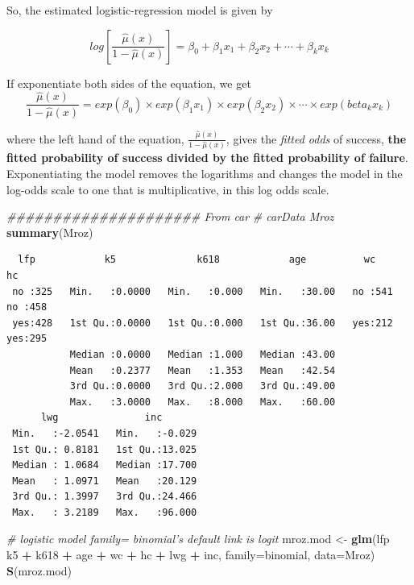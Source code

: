 \documentclass[
]{article}
\newenvironment{Shaded}{\begin{snugshade}}{\end{snugshade}}
\newcommand{\CommentTok}[1]{\textcolor[rgb]{0.56,0.35,0.01}{\textit{#1}}}
\newcommand{\DataTypeTok}[1]{\textcolor[rgb]{0.13,0.29,0.53}{#1}}
\newcommand{\KeywordTok}[1]{\textcolor[rgb]{0.13,0.29,0.53}{\textbf{#1}}}
\newcommand{\NormalTok}[1]{#1}
\newcommand{\OperatorTok}[1]{\textcolor[rgb]{0.81,0.36,0.00}{\textbf{#1}}}
\newcommand{\StringTok}[1]{\textcolor[rgb]{0.31,0.60,0.02}{#1}}
\begin{document}
So, the estimated logistic-regression model is given by

\[log[\frac{\hat\mu(x)}{1-\hat\mu(x)}] = \beta_0 + \beta_1 x_1 + \beta_2 x_2 + \cdots + \beta_k x_k\]

If exponentiate both sides of the equation, we get
\[\frac{\hat\mu(x)}{1-\hat\mu(x)} = exp(\beta_0) \times exp(\beta_1 x_1) \times exp(\beta_2 x_2) \times \cdots \times exp(beta_k x_k)\]

where the left hand of the equation,
\(\frac{\hat\mu(x)}{1-\hat\mu(x)}\), gives the \emph{fitted odds} of
success, \textbf{the fitted probability of success divided by the fitted
probability of failure}. Exponentiating the model removes the logarithms
and changes the model in the log-odds scale to one that is
multiplicative, in this log odds scale.

\begin{Shaded}
\begin{Highlighting}[]
\CommentTok{##################### From car}
\CommentTok{# carData Mroz}
\KeywordTok{summary}\NormalTok{(Mroz)}
\end{Highlighting}
\end{Shaded}

\begin{verbatim}
  lfp            k5              k618            age          wc        hc     
 no :325   Min.   :0.0000   Min.   :0.000   Min.   :30.00   no :541   no :458  
 yes:428   1st Qu.:0.0000   1st Qu.:0.000   1st Qu.:36.00   yes:212   yes:295  
           Median :0.0000   Median :1.000   Median :43.00                      
           Mean   :0.2377   Mean   :1.353   Mean   :42.54                      
           3rd Qu.:0.0000   3rd Qu.:2.000   3rd Qu.:49.00                      
           Max.   :3.0000   Max.   :8.000   Max.   :60.00                      
      lwg               inc        
 Min.   :-2.0541   Min.   :-0.029  
 1st Qu.: 0.8181   1st Qu.:13.025  
 Median : 1.0684   Median :17.700  
 Mean   : 1.0971   Mean   :20.129  
 3rd Qu.: 1.3997   3rd Qu.:24.466  
 Max.   : 3.2189   Max.   :96.000  
\end{verbatim}

\begin{Shaded}
\begin{Highlighting}[]
\CommentTok{# logistic model family= binomial's default link is logit}
\NormalTok{mroz.mod <-}\StringTok{ }\KeywordTok{glm}\NormalTok{(lfp }\OperatorTok{~}\StringTok{ }\NormalTok{k5 }\OperatorTok{+}\StringTok{ }\NormalTok{k618 }\OperatorTok{+}\StringTok{ }\NormalTok{age }\OperatorTok{+}\StringTok{ }\NormalTok{wc }\OperatorTok{+}\StringTok{ }\NormalTok{hc }\OperatorTok{+}\StringTok{ }\NormalTok{lwg }\OperatorTok{+}\StringTok{ }\NormalTok{inc, }\DataTypeTok{family=}\NormalTok{binomial, }\DataTypeTok{data=}\NormalTok{Mroz)}
\KeywordTok{S}\NormalTok{(mroz.mod)}
\end{Highlighting}
\end{Shaded}
\end{document}
